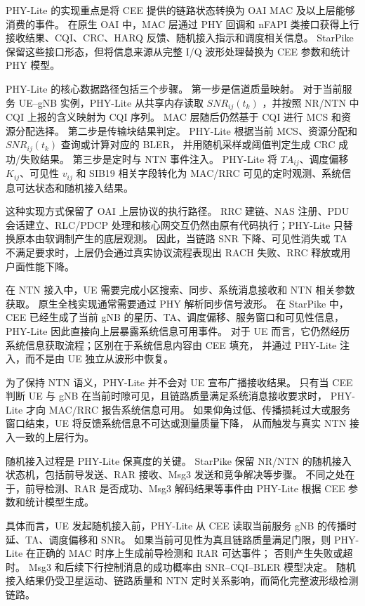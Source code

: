 
PHY-Lite 的实现重点是将 CEE 提供的链路状态转换为 OAI MAC 及以上层能够消费的事件。
在原生 OAI 中，MAC 层通过 PHY 回调和 nFAPI 类接口获得上行接收结果、CQI、CRC、HARQ 反馈、随机接入指示和调度相关信息。
StarPike 保留这些接口形态，但将信息来源从完整 I/Q 波形处理替换为 CEE 参数和统计 PHY 模型。

PHY-Lite 的核心数据路径包括三个步骤。
第一步是信道质量映射。
对于当前服务 UE--gNB 实例，PHY-Lite 从共享内存读取 $SNR_{ij}(t_k)$
，并按照 NR/NTN 中 CQI 上报的含义映射为 CQI 序列。
MAC 层随后仍然基于 CQI 进行 MCS 和资源分配选择。
第二步是传输块结果判定。
PHY-Lite 根据当前 MCS、资源分配和 $SNR_{ij}(t_k)$ 查询或计算对应的 BLER，
并用随机采样或阈值判定生成 CRC 成功/失败结果。
第三步是定时与 NTN 事件注入。
PHY-Lite 将 $TA_{ij}$、调度偏移 $K_{ij}$、可见性 $v_{ij}$ 和 SIB19 相关字段转化为 MAC/RRC 可见的定时观测、系统信息可达状态和随机接入结果。

这种实现方式保留了 OAI 上层协议的执行路径。
RRC 建链、NAS 注册、PDU 会话建立、RLC/PDCP 处理和核心网交互仍然由原有代码执行；PHY-Lite 只替换原本由软调制产生的底层观测。
因此，当链路 SNR 下降、可见性消失或 TA 不满足要求时，上层仍会通过真实协议流程表现出 RACH 失败、RRC 释放或用户面性能下降。


在 NTN 接入中，UE 需要完成小区搜索、同步、系统消息接收和 NTN 相关参数获取。
原生全栈实现通常需要通过 PHY 解析同步信号波形。
在 StarPike 中，CEE 已经生成了当前 gNB 的星历、TA、调度偏移、服务窗口和可见性信息，
PHY-Lite 因此直接向上层暴露系统信息可用事件。
对于 UE 而言，它仍然经历系统信息获取流程；区别在于系统信息内容由 CEE 填充，
并通过 PHY-Lite 注入，而不是由 UE 独立从波形中恢复。

为了保持 NTN 语义，PHY-Lite 并不会对 UE 宣布广播接收结果。
只有当 CEE 判断 UE 与 gNB 在当前时隙可见，且链路质量满足系统消息接收要求时，
PHY-Lite 才向 MAC/RRC 报告系统信息可用。
如果仰角过低、传播损耗过大或服务窗口结束，UE 将反馈系统信息不可达或测量质量下降，
从而触发与真实 NTN 接入一致的上层行为。


随机接入过程是 PHY-Lite 保真度的关键。
StarPike 保留 NR/NTN 的随机接入状态机，包括前导发送、RAR 接收、Msg3 发送和竞争解决等步骤。
不同之处在于，前导检测、RAR 是否成功、Msg3 解码结果等事件由 PHY-Lite 根据 CEE 参数和统计模型生成。

具体而言，UE 发起随机接入前，PHY-Lite 从 CEE 读取当前服务 gNB 的传播时延、TA、调度偏移和 SNR。
如果当前可见性为真且链路质量满足门限，则 PHY-Lite 在正确的 MAC 时序上生成前导检测和 RAR 可达事件；
否则产生失败或超时。
Msg3 和后续下行控制消息的成功概率由 SNR--CQI--BLER 模型决定。
随机接入结果仍受卫星运动、链路质量和 NTN 定时关系影响，而简化完整波形级检测链路。

